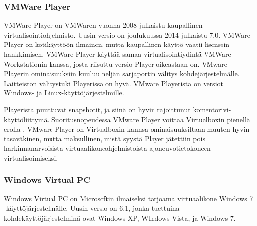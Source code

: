 \subsubsection{VMWare Player}
VMWare Player on VMWaren vuonna 2008 julkaistu kaupallinen virtualisointiohjelmisto. Uusin versio on joulukuussa 2014 julkaistu 7.0. VMWare Player on kotikäyttöön ilmainen, mutta kaupallinen käyttö vaatii lisenssin hankkimisen. VMWare Player käyttää samaa virtualisointiydintä VMWare Workstationin kanssa, josta riisuttu versio Player oikeastaan on. VMware Playerin ominaisuuksiin kuuluu neljän sarjaportin välitys kohdejärjestelmälle. Laitteiston välitystuki Playerissa on hyvä. VMware Playerista on versiot Windows- ja Linux-käyttöjärjestelmille. \citep{vmware1}


Playerista puuttuvat snapshotit, ja siinä on hyvin rajoittunut komentorivi-käyttöliittymä. Suoritusnopeudessa VMware Player voittaa Virtualboxin pienellä erolla \cite{vplayervsvbox}. VMware Player on Virtualboxin kannsa ominaisuuksiltaan muuten hyvin tasaväkinen, mutta maksullinen, mistä syystä Player jätettiin pois harkinnanarvoisista virtuaalikoneohjelmistoista ajoneuvotietokoneen virtualisoimiseksi.






\subsubsection{Windows Virtual PC}
Windows Virtual PC on Microsoftin ilmaiseksi tarjoama virtuaalikone Windows 7 -käyttöjärjestelmälle. Uusin versio on 6.1, jonka tuettuina kohdekäyttöjärjestelminä ovat Windows XP, WIndows Vista, ja Windows 7. \citep{vpc_tips}

